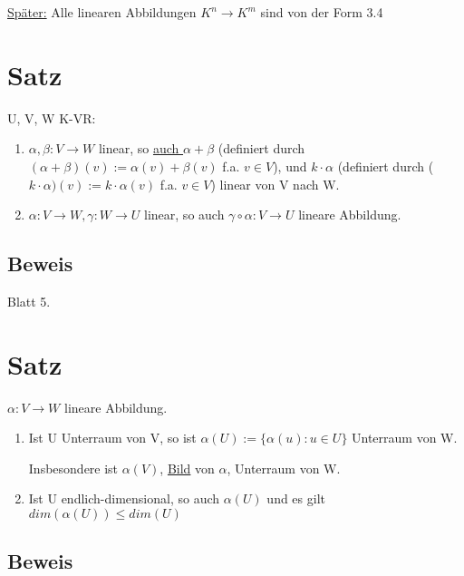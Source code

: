 \documentclass[a4paper, openany]{book}
\begin{document}
      \underline{Später:} Alle linearen Abbildungen $K^n \rightarrow K^m$ sind von der Form 3.4

      \section{Satz}

      U, V, W K-VR:

      \begin{enumerate}[label=(\alph*)]
        \item $\alpha, \beta: V \rightarrow W$ linear, so \underline{auch $\alpha + \beta$} (definiert durch $(\alpha + \beta) (v) := \alpha(v) + \beta(v)$ f.a. $v \in V$), und \underline{$k \cdot \alpha$} (definiert durch ($k \cdot \alpha) (v) := k \cdot \alpha(v)$ f.a. $v \in V$) linear von V nach W.

        \item $\alpha: V \rightarrow W, \gamma : W \rightarrow U$ linear, so auch $\gamma \circ \alpha : V \rightarrow U$ lineare Abbildung.
      \end{enumerate}

      \subsection{Beweis}

      Blatt 5.

      \section{Satz}

      $\alpha: V \rightarrow W$ lineare Abbildung.

      \begin{enumerate}[label=(\alph*)]
        \item Ist U Unterraum von V, so ist $\alpha(U) := \{ \alpha(u) : u \in U\}$ Unterraum von W.

        Insbesondere ist $\alpha(V)$, \underline{Bild} von $\alpha$, Unterraum von W.

        \item Ist U endlich-dimensional, so auch $\alpha(U)$ und es gilt $dim(\alpha(U)) \le dim(U)$ 
      \end{enumerate}

      \subsection{Beweis}
\end{document}
